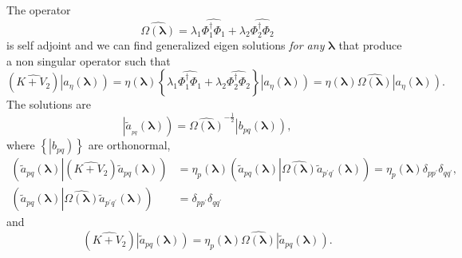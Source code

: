 \documentclass[aps,preprint]{revtex4}%
\begin{document}
The operator
\begin{equation}
\widehat{\Omega\left(  \mathbf{\lambda}\right)  }=\lambda_{1}\widehat{\Phi
_{1}^{\dagger}\Phi_{1}}+\lambda_{2}\widehat{\Phi_{2}^{\dagger}\Phi_{2}}%
\end{equation}
is self adjoint and we can find generalized eigen solutions \emph{for any}
$\mathbf{\lambda}$ that produce a non singular operator such that
\begin{equation}
\left(  \widehat{K+V_{2}}\right)  \left\vert \overset{}{a_{\eta}}\left(
\mathbf{\lambda}\right)  \right)  =\eta\left(  \mathbf{\lambda}\right)
\left\{  \lambda_{1}\widehat{\Phi_{1}^{\dagger}\Phi_{1}}+\lambda
_{2}\widehat{\Phi_{2}^{\dagger}\Phi_{2}}\right\}  \left\vert
\overset{}{a_{\eta}}\left(  \mathbf{\lambda}\right)  \right)  =\eta\left(
\mathbf{\lambda}\right)  \widehat{\Omega\left(  \mathbf{\lambda}\right)
}\left\vert \overset{}{a_{\eta}}\left(  \mathbf{\lambda}\right)  \right)  .
\end{equation}
The solutions are
\begin{equation}
\left\vert \overset{}{\tilde{a}_{_{pq}}}\left(  \mathbf{\lambda}\right)
\right)  =\widehat{\Omega\left(  \mathbf{\lambda}\right)  }^{-\frac{1}{2}%
}\left\vert \overset{}{b_{pq}}\left(  \mathbf{\lambda}\right)  \right)  ,
\end{equation}
where $\left\{  \left\vert \overset{}{b_{pq}}\right)  \right\}  $ are
orthonormal,
\begin{align}
\left(  \tilde{a}_{pq}\left(  \mathbf{\lambda}\right)  \left\vert \left(
\widehat{K+V_{2}}\right)  \tilde{a}_{pq}\left(  \mathbf{\lambda}\right)
\right.  \right)   &  =\eta_{p}\left(  \mathbf{\lambda}\right)  \left(
\tilde{a}_{pq}\left(  \mathbf{\lambda}\right)  \left\vert \widehat{\Omega
\left(  \mathbf{\lambda}\right)  }\tilde{a}_{p^{\prime}q^{\prime}}\left(
\mathbf{\lambda}\right)  \right.  \right)  =\eta_{p}\left(  \mathbf{\lambda
}\right)  \delta_{pp^{\prime}}\delta_{qq^{\prime}},\\
\left(  \tilde{a}_{pq}\left(  \mathbf{\lambda}\right)  \left\vert
\widehat{\Omega\left(  \mathbf{\lambda}\right)  }\tilde{a}_{p^{\prime
}q^{\prime}}\left(  \mathbf{\lambda}\right)  \right.  \right)   &
=\delta_{pp^{\prime}}\delta_{qq^{\prime}}%
\end{align}
and
\begin{equation}
\left(  \widehat{K+V_{2}}\right)  \left\vert \overset{}{\tilde{a}_{pq}}\left(
\mathbf{\lambda}\right)  \right)  =\eta_{p}\left(  \mathbf{\lambda}\right)
\widehat{\Omega\left(  \mathbf{\lambda}\right)  }\left\vert \overset{}{\tilde
{a}_{pq}}\left(  \mathbf{\lambda}\right)  \right)  .
\end{equation}
\end{document}
